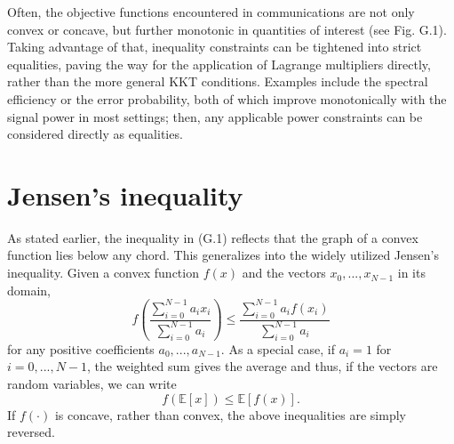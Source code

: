 \documentclass[a4paper, 12pt]{book}
\begin{document}
Often, the objective functions encountered in communications are not only convex or concave, but further monotonic in quantities of interest (see Fig. G.1). Taking advantage of that, inequality constraints can be tightened into strict equalities, paving the way for the application of Lagrange multipliers directly, rather than the more general KKT conditions. Examples include the spectral efficiency or the error probability, both of which improve monotonically with the signal power in most settings; then, any applicable power constraints can be considered directly as equalities.

\section{Jensen's inequality}
As stated earlier, the inequality in (G.1) reflects that the graph of a convex function lies below any chord. This generalizes into the widely utilized Jensen's inequality. Given a convex function $f(x)$ and the vectors $x_{0},...,x_{N-1}$ in its domain,
\begin{equation}
    f\left(\frac{\sum_{i=0}^{N-1}a_{i}x_{i}}{\sum_{i=0}^{N-1}a_{i}}\right)\le\frac{\sum_{i=0}^{N-1}a_{i}f(x_{i})}{\sum_{i=0}^{N-1}a_{i}} \tag{G.8}
\end{equation}
for any positive coefficients $a_{0},...,a_{N-1}$. As a special case, if $a_{i}=1$ for $i=0,...,N-1$, the weighted sum gives the average and thus, if the vectors are random variables, we can write
\begin{equation}
    f(\mathbb{E}[x])\le\mathbb{E}[f(x)]. \tag{G.9}
\end{equation}
If $f(\cdot)$ is concave, rather than convex, the above inequalities are simply reversed.
\end{document}
